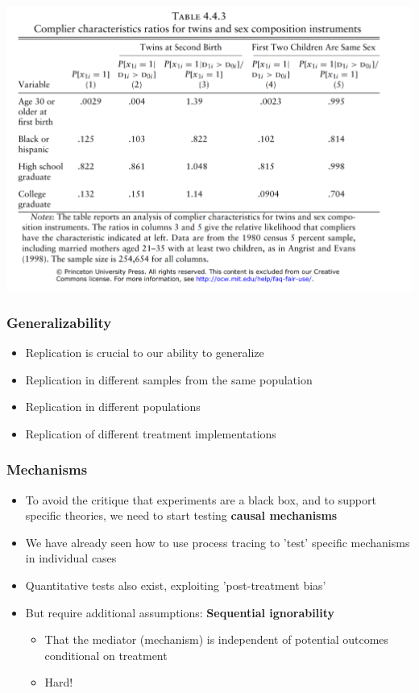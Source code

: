 \documentclass[xcolor=x11names,compress]{beamer}\usepackage[]{graphicx}\usepackage[]{color}
\renewcommand{\(}{\begin{columns}}
\renewcommand{\)}{\end{columns}}
\newcommand{\<}[1]{\begin{column}{#1}}
\renewcommand{\>}{\end{column}}
\begin{document}
\begin{frame}
\includegraphics[width=\linewidth]{twins_compliers.png}
\end{frame}

\begin{frame}
\frametitle{Generalizability}
\begin{itemize}
\item Replication is crucial to our ability to generalize
\pause
\item Replication in different samples from the same population
\pause
\item Replication in different populations
\pause
\item Replication of different treatment implementations
\end{itemize}
\end{frame}

\begin{frame}
\frametitle{Mechanisms}
\begin{itemize}
\item To avoid the critique that experiments are a black box, and to support specific theories, we need to start testing \textbf{causal mechanisms}
\pause
\item We have already seen how to use process tracing to 'test' specific mechanisms in individual cases
\pause
\item Quantitative tests also exist, exploiting 'post-treatment bias'
\pause
\item But require additional assumptions: \textbf{Sequential ignorability}
\begin{itemize}
\item That the mediator (mechanism) is independent of potential outcomes conditional on treatment
\pause
\item Hard!
\end{itemize}
\end{itemize}
\end{frame}
\end{document}
